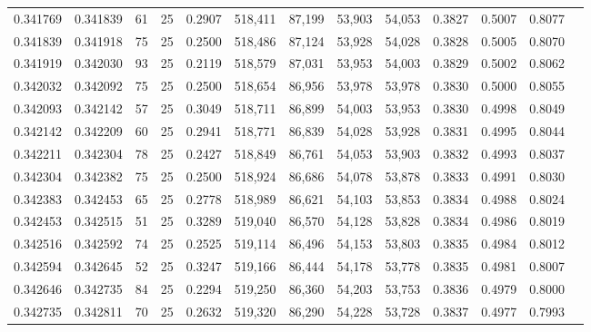 \begin{tabular}{rrrrrrrrrrrrr}
0.341769 & 0.341839 &    61 &  25 &                                     0.2907 & 518,411 &  87,199 &  53,903 &  54,053 & 0.3827 & 0.5007 & 0.8077 \\
0.341839 & 0.341918 &    75 &  25 &                                     0.2500 & 518,486 &  87,124 &  53,928 &  54,028 & 0.3828 & 0.5005 & 0.8070 \\
0.341919 & 0.342030 &    93 &  25 &                                     0.2119 & 518,579 &  87,031 &  53,953 &  54,003 & 0.3829 & 0.5002 & 0.8062 \\
0.342032 & 0.342092 &    75 &  25 &                                     0.2500 & 518,654 &  86,956 &  53,978 &  53,978 & 0.3830 & 0.5000 & 0.8055 \\
0.342093 & 0.342142 &    57 &  25 &                                     0.3049 & 518,711 &  86,899 &  54,003 &  53,953 & 0.3830 & 0.4998 & 0.8049 \\
0.342142 & 0.342209 &    60 &  25 &                                     0.2941 & 518,771 &  86,839 &  54,028 &  53,928 & 0.3831 & 0.4995 & 0.8044 \\
0.342211 & 0.342304 &    78 &  25 &                                     0.2427 & 518,849 &  86,761 &  54,053 &  53,903 & 0.3832 & 0.4993 & 0.8037 \\
0.342304 & 0.342382 &    75 &  25 &                                     0.2500 & 518,924 &  86,686 &  54,078 &  53,878 & 0.3833 & 0.4991 & 0.8030 \\
0.342383 & 0.342453 &    65 &  25 &                                     0.2778 & 518,989 &  86,621 &  54,103 &  53,853 & 0.3834 & 0.4988 & 0.8024 \\
0.342453 & 0.342515 &    51 &  25 &                                     0.3289 & 519,040 &  86,570 &  54,128 &  53,828 & 0.3834 & 0.4986 & 0.8019 \\
0.342516 & 0.342592 &    74 &  25 &                                     0.2525 & 519,114 &  86,496 &  54,153 &  53,803 & 0.3835 & 0.4984 & 0.8012 \\
0.342594 & 0.342645 &    52 &  25 &                                     0.3247 & 519,166 &  86,444 &  54,178 &  53,778 & 0.3835 & 0.4981 & 0.8007 \\
0.342646 & 0.342735 &    84 &  25 &                                     0.2294 & 519,250 &  86,360 &  54,203 &  53,753 & 0.3836 & 0.4979 & 0.8000 \\
0.342735 & 0.342811 &    70 &  25 &                                     0.2632 & 519,320 &  86,290 &  54,228 &  53,728 & 0.3837 & 0.4977 & 0.7993 \\

\end{tabular}
